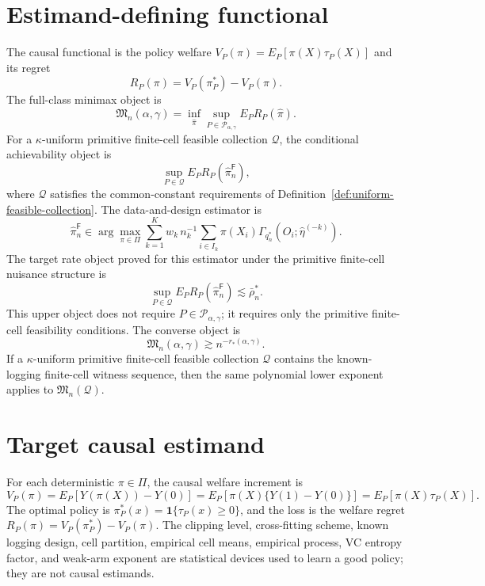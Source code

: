 \documentclass[11pt]{article}
\newcommand{\one}{\mathbf{1}}
\theoremstyle{definition}
\theoremstyle{plain}
\theoremstyle{remark}
\begin{document}
\section{Estimand-defining functional}
The causal functional is the policy welfare \(V_P(\pi)=E_P[\pi(X)\tau_P(X)]\)
and its regret
\[
R_P(\pi)=V_P(\pi_P^*)-V_P(\pi).
\]
The full-class minimax object is
\[
\mathfrak M_n(\alpha,\gamma)
=\inf_{\widehat\pi}
\sup_{P\in\mathcal P_{\alpha,\gamma}}E_P R_P(\widehat\pi).
\]
For a \(\kappa\)-uniform primitive finite-cell feasible collection
\(\mathcal Q\), the conditional achievability object is
\[
\sup_{P\in\mathcal Q}E_P R_P(\widehat\pi_n^{\mathsf F}),
\]
where \(\mathcal Q\) satisfies the common-constant requirements of
Definition~\ref{def:uniform-feasible-collection}.  The data-and-design
estimator is
\[
\widehat\pi_n^{\mathsf F}
\in\arg\max_{\pi\in\Pi}
\sum_{k=1}^K w_k\,n_k^{-1}\sum_{i\in I_k}
\pi(X_i)\Gamma_{q_n^*}(O_i;\widehat\eta^{(-k)}).
\]
The target rate object proved for this estimator under the primitive
finite-cell nuisance structure is
\[
\sup_{P\in\mathcal Q}
E_P R_P(\widehat\pi_n^{\mathsf F})
\lesssim
\bar\rho_n^*.
\]
This upper object does not require \(P\in\mathcal P_{\alpha,\gamma}\); it
requires only the primitive finite-cell feasibility conditions.  The converse
object is
\[
\mathfrak M_n(\alpha,\gamma)
\gtrsim n^{-r_*(\alpha,\gamma)}.
\]
If a \(\kappa\)-uniform primitive finite-cell feasible collection
\(\mathcal Q\) contains the known-logging finite-cell witness sequence, then
the same polynomial lower exponent applies to \(\mathfrak M_n(\mathcal Q)\).

\section{Target causal estimand}
For each deterministic \(\pi\in\Pi\), the causal welfare increment is
\[
V_P(\pi)=E_P[Y(\pi(X))-Y(0)]
=E_P[\pi(X)\{Y(1)-Y(0)\}]
=E_P[\pi(X)\tau_P(X)].
\]
The optimal policy is \(\pi_P^*(x)=\one\{\tau_P(x)\ge0\}\), and the loss is
the welfare regret \(R_P(\pi)=V_P(\pi_P^*)-V_P(\pi)\).  The clipping level,
cross-fitting scheme, known logging design, cell partition, empirical cell
means, empirical process, VC entropy factor, and weak-arm exponent are
statistical devices used to learn a good policy; they are not causal
estimands.
\end{document}
